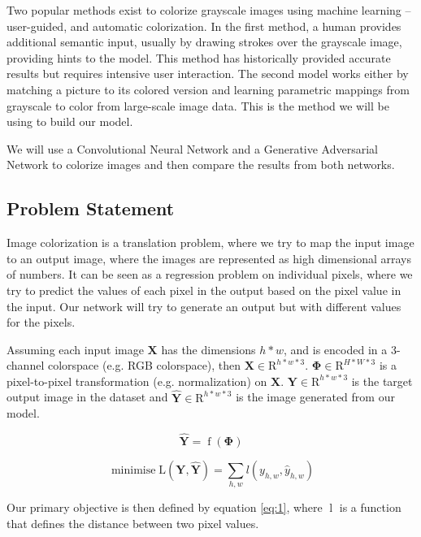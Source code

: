 \documentclass{article}
\begin{document}
Two popular methods exist to colorize grayscale images using machine learning –
user-guided, and automatic colorization. In the first method, a human provides
additional semantic input, usually by drawing strokes over the grayscale image,
providing hints to the model. This method has historically provided accurate
results but requires intensive user interaction. The second model works either
by matching a picture to its colored version and learning parametric mappings
from grayscale to color from large-scale image data. This is the method we will
be using to build our model.

We will use a Convolutional Neural Network and a Generative Adversarial Network
to colorize images and then compare the results from both networks.

\subsection{Problem Statement}

Image colorization is a translation problem, where we try to map the input image
to an output image, where the images are represented as high dimensional arrays
of numbers. It can be seen as a regression problem on individual pixels, where
we try to predict the values of each pixel in the output based on the pixel
value in the input. Our network will try to generate an output but with
different values for the pixels.

Assuming each input image $\mathbf{X}$ has the dimensions $h * w$, and is
encoded in a 3-channel colorspace (e.g. RGB colorspace), then $\mathbf{X} \in
\mathrm{R}^{\mathit{h * w * 3}}$. $\mathbf{\Phi} \in \mathrm{R}^{\mathit{H * W *
3}}$ is a pixel-to-pixel transformation (e.g. normalization) on $\mathbf{X}$.
$\mathbf{Y} \in \mathrm{R}^{\mathit{h * w * 3}}$ is the target output image in
the dataset and $\mathbf{\widehat{Y}} \in \mathrm{R}^{\mathit{h * w * 3}}$ is
the image generated from our model.

\begin{equation}
  \mathbf{\widehat{Y}}
  =
  \mathop{f} (\mathbf{\Phi})
\end{equation}

\begin{equation} \label{eq:1}
  \mathop{minimise}
  \mathrm{L} (\mathbf{Y}, \mathbf{\widehat{Y}})
  =
  \sum_{h, w} l (y_{h, w}, \widehat{y}_{h, w})
\end{equation}

Our primary objective is then defined by equation \ref{eq:1}, where
$\mathop{l}$ is a function that defines the distance between two pixel values.
\end{document}
